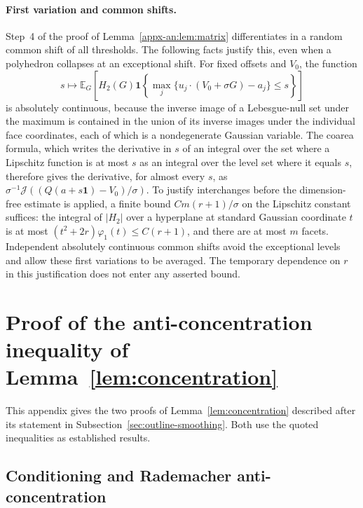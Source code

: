 \documentclass[11pt,letterpaper]{article}
\newif\ifshowpolish
\newif\ifshowrev
\newenvironment{revblock}{\ifshowrev\color{revblue}%
\hypersetup{linkcolor=revblue,citecolor=revblue,urlcolor=revblue}\fi}{}
\newif\ifshowtrim
\newcommand{\trim}[1]{\ifshowtrim{\color{revblue}%
\hypersetup{linkcolor=revblue,citecolor=revblue,urlcolor=revblue}#1}\else#1\fi}
\newcommand{\trs}[1]{\ifshowtrim{\color{revblue}#1}\else#1\fi}
\theoremstyle{remark}
\newcommand{\E}{\mathbb E}
\newcommand{\ind}{\mathbf 1}
\newcommand{\surf}{\mathcal J}
\begin{document}
\begin{revblock}
\paragraph{First variation and common shifts.}
Step~4 of the proof of Lemma~\ref{appx-an:lem:matrix} differentiates in a
random common shift of all thresholds. The following facts justify this,
even when a polyhedron collapses at an exceptional shift. For fixed
offsets and \(V_0\), the function
\[
 s\longmapsto
 \E_G\left[H_2(G)\ind\left\{
   \max_j\{u_j\cdot(V_0+\sigma G)-a_j\}\le s\right\}\right]
\]
is absolutely continuous, because the inverse image of a Lebesgue-null
set under the maximum is contained in the union of its inverse images
under the individual face coordinates, each of which is a nondegenerate
Gaussian variable. The coarea formula, which writes the derivative in
\(s\) of an integral over the set where a Lipschitz function is at most
\(s\) as an integral over the level set where it equals \(s\), therefore
gives the derivative, for almost every \(s\), as
\(\sigma^{-1}\surf((Q(a+s\mathbf1)-V_0)/\sigma)\). To justify interchanges
before the dimension-free estimate is applied, a finite bound
\(Cm(r+1)/\sigma\) on the Lipschitz constant suffices: the integral of
\(|H_2|\) over a hyperplane at standard Gaussian coordinate \(t\) is at
most \((t^2+2r)\varphi_1(t)\le C(r+1)\), and there are at most \(m\)
facets. Independent absolutely continuous common shifts avoid the
exceptional levels and allow these first variations to be averaged. The
temporary dependence on \(r\) in this justification does not enter any
asserted bound.
\end{revblock}


\section{\texorpdfstring{\trs{Proof of the anti-concentration inequality of Lemma~\ref{lem:concentration}}}{Proof of the anti-concentration inequality of Lemma 1}}\label{appx-app:concentration}

\trim{This appendix gives the two proofs of
Lemma~\ref{lem:concentration} described after its statement in
Subsection~\ref{sec:outline-smoothing}. Both use the quoted inequalities
as established results.}

\begingroup
\ifshowpolish\color{magenta}\fi
\subsection{Conditioning and Rademacher anti-concentration}
\label{appx-conc:conditioning}
\endgroup
\end{document}
